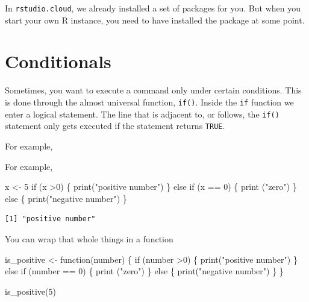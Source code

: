 \documentclass[
  letterpaper,
]{book}
\newenvironment{Shaded}{\begin{snugshade}}{\end{snugshade}}
\newcommand{\ControlFlowTok}[1]{\textcolor[rgb]{0.00,0.23,0.31}{#1}}
\newcommand{\DecValTok}[1]{\textcolor[rgb]{0.68,0.00,0.00}{#1}}
\newcommand{\FunctionTok}[1]{\textcolor[rgb]{0.28,0.35,0.67}{#1}}
\newcommand{\NormalTok}[1]{\textcolor[rgb]{0.00,0.23,0.31}{#1}}
\newcommand{\OtherTok}[1]{\textcolor[rgb]{0.00,0.23,0.31}{#1}}
\newcommand{\SpecialCharTok}[1]{\textcolor[rgb]{0.37,0.37,0.37}{#1}}
\newcommand{\StringTok}[1]{\textcolor[rgb]{0.13,0.47,0.30}{#1}}
\theoremstyle{definition}
\theoremstyle{definition}
\theoremstyle{plain}
\theoremstyle{definition}
\theoremstyle{plain}
\theoremstyle{plain}
\theoremstyle{remark}
\begin{document}
In \texttt{rstudio.cloud}, we already installed a set of packages for
you. But when you start your own R instance, you need to have installed
the package at some point.

\hypertarget{conditionals}{%
\section{Conditionals}\label{conditionals}}

Sometimes, you want to execute a command only under certain conditions.
This is done through the almost universal function, \texttt{if()}.
Inside the \texttt{if} function we enter a logical statement. The line
that is adjacent to, or follows, the \texttt{if()} statement only gets
executed if the statement returns \texttt{TRUE}.

For example,

For example,

\begin{Shaded}
\begin{Highlighting}[]
\NormalTok{x }\OtherTok{\textless{}{-}} \DecValTok{5}
\ControlFlowTok{if}\NormalTok{ (x }\SpecialCharTok{\textgreater{}}\DecValTok{0}\NormalTok{) \{}
  \FunctionTok{print}\NormalTok{(}\StringTok{"positive number"}\NormalTok{)}
\NormalTok{\} }\ControlFlowTok{else} \ControlFlowTok{if}\NormalTok{ (x }\SpecialCharTok{==} \DecValTok{0}\NormalTok{)  \{}
  \FunctionTok{print}\NormalTok{ (}\StringTok{"zero"}\NormalTok{)}
\NormalTok{\} }\ControlFlowTok{else}\NormalTok{ \{}
  \FunctionTok{print}\NormalTok{(}\StringTok{"negative number"}\NormalTok{)}
\NormalTok{\}}
\end{Highlighting}
\end{Shaded}

\begin{verbatim}
[1] "positive number"
\end{verbatim}

You can wrap that whole things in a function

\begin{Shaded}
\begin{Highlighting}[]
\NormalTok{is\_positive }\OtherTok{\textless{}{-}} \ControlFlowTok{function}\NormalTok{(number) \{}
  \ControlFlowTok{if}\NormalTok{ (number }\SpecialCharTok{\textgreater{}}\DecValTok{0}\NormalTok{) \{}
    \FunctionTok{print}\NormalTok{(}\StringTok{"positive number"}\NormalTok{)}
\NormalTok{  \} }\ControlFlowTok{else} \ControlFlowTok{if}\NormalTok{ (number }\SpecialCharTok{==} \DecValTok{0}\NormalTok{)  \{}
    \FunctionTok{print}\NormalTok{ (}\StringTok{"zero"}\NormalTok{)}
\NormalTok{  \} }\ControlFlowTok{else}\NormalTok{ \{}
    \FunctionTok{print}\NormalTok{(}\StringTok{"negative number"}\NormalTok{)}
\NormalTok{  \}}
\NormalTok{\}}

\FunctionTok{is\_positive}\NormalTok{(}\DecValTok{5}\NormalTok{)}
\end{Highlighting}
\end{Shaded}
\end{document}
